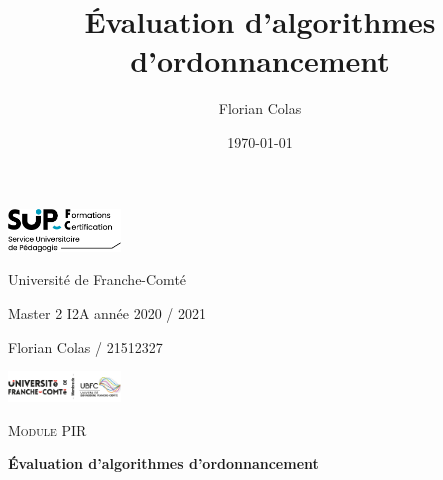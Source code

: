 \documentclass[a4paper,12pt]{report}
\title{Évaluation d'algorithmes d'ordonnancement}
\author{Florian Colas}
\date{\today}
\theoremstyle{plain}				%
\theoremstyle{definition}				%
\begin{document}

\begin{titlepage}
\begin{center}
\includegraphics[width=3cm]{logo_supfc.png}
\hfill
\parbox{.5\linewidth}{%
	\centering
	Universit\'e de Franche-Comté	\par
	Master 2 I2A	année 2020 / 2021 \par
	Florian Colas / 21512327
	\vspace{.05\textheight}
	\vspace{.05\textheight}
}
\hfill
\includegraphics[width=3cm]{logoUnivFC.png}

\vspace{.05\textheight}
{\LARGE\scshape Module PIR\par}

\vspace{.05\textheight}
\vspace{.05\textheight}
\vspace{.05\textheight}
{\Huge\bfseries Évaluation d'algorithmes d'ordonnancement\par}


\end{center}
\end{titlepage}
\end{document}
